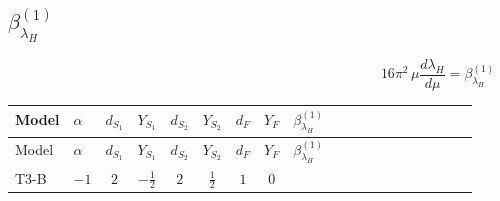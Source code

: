 \documentclass{article}
\begin{document}
\begin{landscape}
\section*{$\beta_{\lambda_H}^{(1)}$}
\[16\pi^2\,\mu\frac{d \lambda_H}{d\mu}=\beta_{\lambda_H}^{(1)}\]
\tiny
\begin{longtable}{@{}llcccccc >{\raggedright\arraybackslash}p{0.54\linewidth}@{}}
\toprule
Model & $\alpha$ & $d_{S_1}$ & $Y_{S_1}$ & $d_{S_2}$ & $Y_{S_2}$ & $d_F$ & $Y_F$ & $\beta_{\lambda_H}^{(1)}$ \\
\midrule
\endfirsthead
\toprule
Model & $\alpha$ & $d_{S_1}$ & $Y_{S_1}$ & $d_{S_2}$ & $Y_{S_2}$ & $d_F$ & $Y_F$ & $\beta_{\lambda_H}^{(1)}$ \\
\midrule
\endhead
T3-B & $-1$ & $2$ & $-\frac{1}{2}$ & $2$ & $\frac{1}{2}$ & $1$ & $0$ & \scriptsize\adjustbox{max width=\linewidth}{$\begin{gathered} {\lambda_H} (12 \operatorname{Tr}\!\left({Y_d}\,\left({Y_d}\right)^{\dagger}\right)+4 \operatorname{Tr}\!\left({Y_e}\,\left({Y_e}\right)^{\dagger}\right)+12 \operatorname{Tr}\!\left({Y_u}\,\left({Y_u}\right)^{\dagger}\right)) \\ -12 \operatorname{Tr}\!\left({Y_d}\,\left({Y_d}\right)^{\dagger}\,{Y_d}\,\left({Y_d}\right)^{\dagger}\right) \\ -4 \operatorname{Tr}\!\left({Y_e}\,\left({Y_e}\right)^{\dagger}\,{Y_e}\,\left({Y_e}\right)^{\dagger}\right) \\ -12 \operatorname{Tr}\!\left({Y_u}\,\left({Y_u}\right)^{\dagger}\,{Y_u}\,\left({Y_u}\right)^{\dagger}\right) \\ +8 {\lambda_{H^\dagger H^\dagger S_1^\dagger S_1^\dagger}} \left({\lambda_{H^\dagger H^\dagger S_1^\dagger S_1^\dagger}}\right)^{*} \\ +4 {\lambda_{H H^\dagger S_1^\dagger S_2^\dagger}^{\rm Cross}} \left({\lambda_{H H^\dagger S_1^\dagger S_2^\dagger}^{\rm Cross}}\right)^{*} \\ +8 {\lambda_{H^\dagger H^\dagger S_2 S_2}} \left({\lambda_{H^\dagger H^\dagger S_2 S_2}}\right)^{*} \\ +4 {\lambda_{T3}} \left({\lambda_{T3}}\right)^{*} \\ +\frac{9 {g_2}^4}{4} \\ +{g_Y}^2 \left(\frac{3 {g_2}^2}{2}-3 {\lambda_H}\right) \\ -9 {g_2}^2 {\lambda_H} \\ +\frac{3 {g_Y}^4}{4} \\ +12 {\lambda_H}^2 \\ +4 {\lambda_{H1}}^2 \\ +\frac{{\lambda_{H1}^{\rm Adj}}^2}{4} \\ +4 {\lambda_{H2}}^2 \\ +\frac{{\lambda_{H2}^{\rm Adj}}^2}{4}\end{gathered}$} \\

\end{longtable}
\end{landscape}
\end{document}
